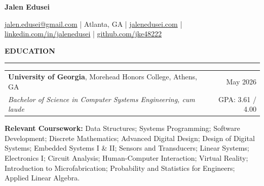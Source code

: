 \documentclass[letterpaper,10pt]{article}
\newcommand{\SectionGapBefore}{12pt}
\newcommand{\SectionGapAfter}{4pt}
\newcommand{\sectiontitle}[1]{%
  \Needspace*{5\baselineskip}%
  \vspace{\SectionGapBefore}%
  {\textbf{\large #1}}\par
  \vspace{-6pt}%
  \rule{\textwidth}{0.4pt}\par
  \vspace{\SectionGapAfter}%
}
\begin{document}
\begin{center}
{\LARGE \textbf{Jalen Edusei}}\par
\vspace{4pt}
\href{mailto:jalen.edusei@gmail.com}{jalen.edusei@gmail.com} \;|\;
Atlanta, GA \;|\;
\href{https://www.jalenedusei.com}{jalenedusei.com} \;|\;
\href{https://www.linkedin.com/in/jalenedusei}{linkedin.com/in/jalenedusei} \;|\;
\href{https://github.com/jke48222}{github.com/jke48222}
\end{center}

\sectiontitle{EDUCATION}
\begin{tabularx}{\textwidth}{@{}X r@{}}
\textbf{University of Georgia}, Morehead Honors College, Athens, GA & May 2026 \\
\textit{Bachelor of Science in Computer Systems Engineering, cum laude} & GPA: 3.61 / 4.00 \\
\end{tabularx}
\vspace{3pt}

\textbf{Relevant Coursework:} Data Structures; Systems Programming; Software Development; Discrete Mathematics; Advanced Digital Design; Design of Digital Systems; Embedded Systems I \& II; Sensors and Transducers; Linear Systems; Electronics I; Circuit Analysis; Human-Computer Interaction; Virtual Reality; Introduction to Microfabrication; Probability and Statistics for Engineers; Applied Linear Algebra.

\end{document}
